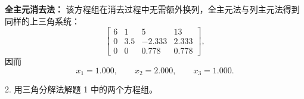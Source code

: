 \documentclass[11pt, a4paper]{ctexart}
\begin{document}
\begin{solution}
    \textbf{全主元消去法：}
    该方程组在消去过程中无需额外换列，全主元法与列主元法得到同样的上三角系统：
    \[
        \left[
        \begin{array}{ccc|c}
            6 & 1 & 5 & 13 \\
            0 & 3.5 & -2.333 & 2.333 \\
            0 & 0 & 0.778 & 0.778
        \end{array}
        \right],
    \]
    因而
    \[
        x_1 = 1.000,\qquad x_2 = 2.000,\qquad x_3 = 1.000.
    \]
\end{solution}


\begin{problem}{2. 用三角分解法解题 1 中的两个方程组。}
\end{problem}
\end{document}
